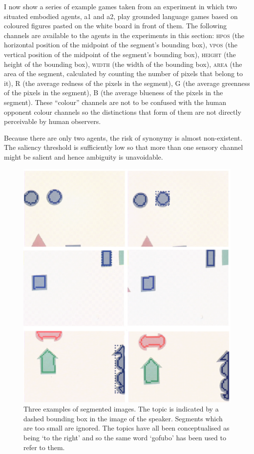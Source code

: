I now show a series of example games taken from 
an experiment in which two situated embodied agents,
{\bfshape a1} and {\bfshape a2}, play grounded language games based on 
coloured figures pasted on the white board in front
of them. The following channels are available to the agents 
in the experiments in this section: 
\textsc{hpos} (the horizontal position of the midpoint 
of the segment's bounding box), 
\textsc{vpos} (the vertical position of the midpoint of the segment's 
bounding box), \textsc{height} (the height of the bounding box), 
\textsc{width} (the width of the bounding box), \textsc{area}
(the area of the segment, calculated
by counting the number of pixels that belong to it), 
R (the average redness of the pixels in the segment), 
G (the average greenness of the pixels in the segment), 
B (the average blueness of the pixels in the segment). 
These ``colour'' channels are not to be confused with the 
human opponent colour channels so the distinctions 
that form of them are not directly perceivable by 
human observers.

Because there are only two agents, the 
risk of synonymy is almost non-existent. The saliency 
threshold is sufficiently low so that more than one
sensory channel might be salient and hence ambiguity
is unavoidable. 

\begin{figure}
\begin{center}
\includegraphics[width=0.8\columnwidth]{chap7/figs/plate-10.pdf}
\end{center}
\caption{Three examples of segmented images. The 
topic is indicated by a dashed bounding box in the 
image of the speaker. Segments which are too small 
are ignored. The topics have all been conceptualised
as being `to the right' and so the same word 
`gofubo' has been used to refer to them. }
\label{fig:plate-10}
\end{figure}

